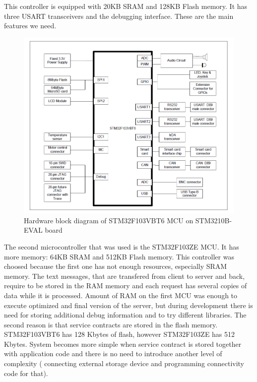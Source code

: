 This controller is equipped with 20KB SRAM and 128KB Flash memory.
It has three USART transceivers and the debugging interface.
These are the main features we need.

\begin{center}
 \begin{figure}[h]
	\includegraphics[width=\textwidth]{../images/implementation/embedded_server/stm32f103vbt6_hardware.png}
	\caption{Hardware block diagram of STM32F103VBT6 MCU on STM3210B-EVAL board
	\cite{stm_eval_board_manual}}
	\label{fig:stm32f103vbt6_hardware}
 \end{figure}
\end{center}

The second microcontroller that was used  is the STM32F103ZE MCU. It has more
memory:
64KB SRAM and 512KB Flash memory. This controller was choosed because the first
one has not enough resources, especially SRAM memory. The text messages, that
are transfered from client to server and back, require to be stored in the RAM
memory and each request has several copies of data while it is processed.
Amount of RAM on the first MCU was enough to execute optimized and final version of the server, but during development there is need for
storing additional debug information and to try different libraries.
The second reason is that service contracts are stored in the flash memory.
STM32F103VBT6 has 128 Kbytes of flash, however STM32F103ZE has 512 Kbytes.
System becomes more simple when service contract is stored together with
application code and there is no need to introduce another level of complexity (
connecting external storage device and programming connectivity code for
that). 


